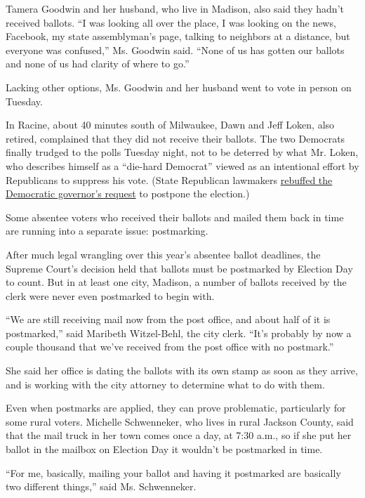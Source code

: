 Tamera Goodwin and her husband, who live in Madison, also said they
hadn't received ballots. ``I was looking all over the place, I was
looking on the news, Facebook, my state assemblyman's page, talking to
neighbors at a distance, but everyone was confused,'' Ms. Goodwin said.
``None of us has gotten our ballots and none of us had clarity of where
to go.''

Lacking other options, Ms. Goodwin and her husband went to vote in
person on Tuesday.

In Racine, about 40 minutes south of Milwaukee, Dawn and Jeff Loken,
also retired, complained that they did not receive their ballots. The
two Democrats finally trudged to the polls Tuesday night, not to be
deterred by what Mr. Loken, who describes himself as a ``die-hard
Democrat'' viewed as an intentional effort by Republicans to suppress
his vote. (State Republican lawmakers
\href{https://www.nytimes3xbfgragh.onion/2020/04/06/us/politics/wisconsin-primary-voting-coronavirus.html}{rebuffed
the Democratic governor's request} to postpone the election.)

Some absentee voters who received their ballots and mailed them back in
time are running into a separate issue: postmarking.

After much legal wrangling over this year's absentee ballot deadlines,
the Supreme Court's decision held that ballots must be postmarked by
Election Day to count. But in at least one city, Madison, a number of
ballots received by the clerk were never even postmarked to begin with.

``We are still receiving mail now from the post office, and about half
of it is postmarked,'' said Maribeth Witzel-Behl, the city clerk. ``It's
probably by now a couple thousand that we've received from the post
office with no postmark.''

She said her office is dating the ballots with its own stamp as soon as
they arrive, and is working with the city attorney to determine what to
do with them.

Even when postmarks are applied, they can prove problematic,
particularly for some rural voters. Michelle Schwenneker, who lives in
rural Jackson County, said that the mail truck in her town comes once a
day, at 7:30 a.m., so if she put her ballot in the mailbox on Election
Day it wouldn't be postmarked in time.

``For me, basically, mailing your ballot and having it postmarked are
basically two different things,'' said Ms. Schwenneker.

